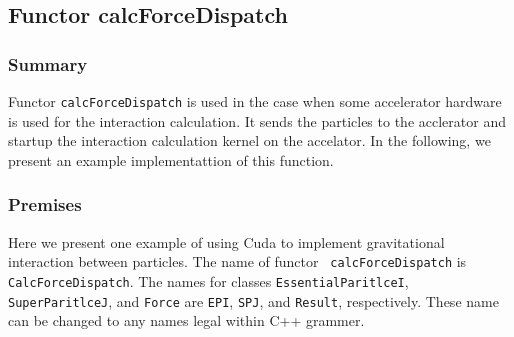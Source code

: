 \subsection{Functor calcForceDispatch}
\label{sec:example_userdefined_calcForceDispatch}

\subsubsection{Summary}


Functor {\tt calcForceDispatch} is used in the case when some
accelerator hardware is used for the interaction calculation.
It sends the particles to the acclerator and startup the interaction
calculation kernel on the accelator. In the following, we present an
example implementattion of this function.

\subsubsection{Premises}



Here we present one example of using Cuda to implement gravitational
interaction between particles.  The name of functor {\tt
  calcForceDispatch} is {\tt CalcForceDispatch}. The names for classes
{\tt EssentialParitlceI},  {\tt SuperParitlceJ}, and 
{\tt Force} are {\tt EPI}, {\tt SPJ}, and {\tt Result}, respectively.
These name can be changed to any names legal within C++ grammer.


